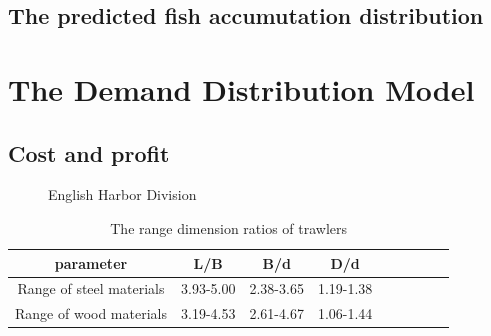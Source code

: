 \documentclass{mcmthesis}
\begin{document}
 \subsection{The predicted fish accumutation distribution}


\section{The Demand Distribution Model}
\subsection{Cost and profit}
\begin{figure}[h]
  \caption{English Harbor Division}\label{figure1}
\end{figure}

\begin{table}[!htb]
\centering
\setlength{\abovecaptionskip}{0pt}%
\setlength{\belowcaptionskip}{15pt}%
\caption{The range dimension ratios of  trawlers}
\begin{tabular}{ccccccccc}
\toprule[1.5pt]
parameter &L/B&B/d&D/d\\
\toprule[1.5pt]
Range of steel materials&3.93-5.00&2.38-3.65&1.19-1.38\\
Range of wood materials&3.19-4.53&2.61-4.67&1.06-1.44\\
\bottomrule[1.5pt]
\end{tabular}
\end{table}
\end{document}
